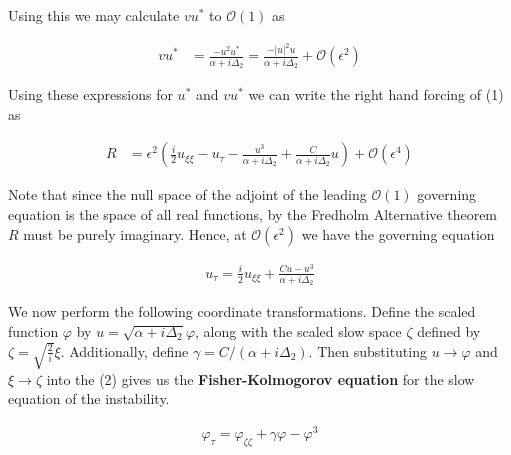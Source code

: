 \documentclass[12pt, a4paper]{article}
\begin{document}
\begin{enumerate}
\begin{enumerate}
        Using this we may calculate $vu^*$ to $\mathcal O(1)$ as 

        \begin{align*}
            vu^* &= \frac{-u^2u^*}{\alpha + i \Delta_2} = \frac{-|u|^2u}{\alpha + i \Delta_2} + \mathcal O(\epsilon^2)
        \end{align*}

        Using these expressions for $u^*$ and $vu^*$ we can write the right hand forcing of (1) as 

        \begin{align*}
            R &= \epsilon^2 \left(\frac{i}{2} u_{\xi\xi} - u_\tau - \frac{u^3}{\alpha + i \Delta_2} + \frac{C}{\alpha + i \Delta_2} u \right) + \mathcal O(\epsilon^4)
        \end{align*}


        Note that since the null space of the adjoint of the leading $\mathcal O(1)$ governing equation is the space of all real functions, by the Fredholm Alternative theorem $R$ must be purely imaginary. Hence, at $\mathcal O(\epsilon^2)$ we have the governing equation
        
        \begin{align}
            u_\tau = \frac{i}{2} u_{\xi\xi} + \frac{Cu - u^3}{\alpha+i\Delta_2}
        \end{align}

        We now perform the following coordinate transformations. Define the scaled function $\varphi$ by $u = \sqrt{\alpha + i \Delta_2} \varphi$, along with the scaled slow space $\zeta$ defined by $\zeta = \sqrt{\frac{2}{i}} \xi$. Additionally, define $\gamma = C/(\alpha + i\Delta_2)$. Then substituting $u \rightarrow \varphi$ and $\xi \rightarrow \zeta$ into the (2) gives us the \textbf{Fisher-Kolmogorov equation} for the slow equation of the instability.

        \begin{align*}
            \varphi_\tau = \varphi_{\zeta \zeta} + \gamma \varphi - \varphi^3
        \end{align*}

    \end{enumerate}
\end{enumerate}
\end{document}
